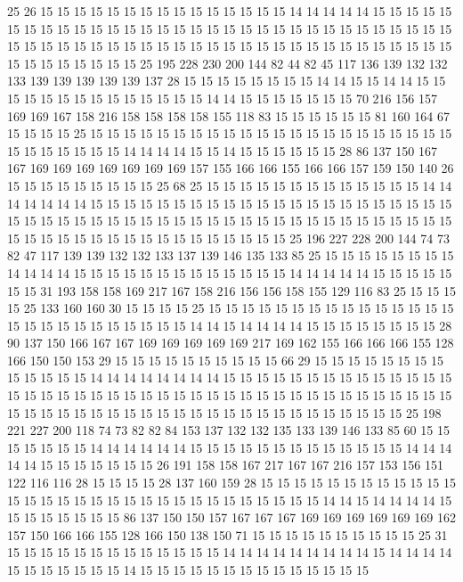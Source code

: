 25 26 15 15 15 15 15 15 15 15 15 15 15 15 15 15 15 14 14 14
14 14 15 15 15 15 15 15 15 15 15 15 15 15 15 15 15 15 15 15
15 15 15 15 15 15 15 15 15 15 15 15 15 15 15 15 15 15 15 15
15 15 15 15 15 15 15 15 15 15 15 15 15 15 15 15 15 15 15 15
15 15 15 15 15 15 15 15 15 25 195 228 230 200 144 82 44 82 45 117
136 139 132 132 133 139 139 139 139 139 137 28 15 15 15 15 15 15 15 15
14 14 15 15 14 14 15 15 15 15 15 15 15 15 15 15 15 15 15 15
14 14 15 15 15 15 15 15 15 70 216 156 157 169 169 167 158 216 158 158
158 158 155 118 83 15 15 15 15 15 15 81 160 164 67 15 15 15 15 25
15 15 15 15 15 15 15 15 15 15 15 15 15 15 15 15 15 15 15 15
15 15 15 15 15 15 15 15 15 14 14 14 14 15 15 14 15 15 15 15
15 15 28 86 137 150 167 167 169 169 169 169 169 169 169 157 155 166 166 155
166 166 157 159 150 140 26 15 15 15 15 15 15 15 15 15 25 68 25 15
15 15 15 15 15 15 15 15 15 15 15 15 14 14 14 14 14 14 14 15
15 15 15 15 15 15 15 15 15 15 15 15 15 15 15 15 15 15 15 15
15 15 15 15 15 15 15 15 15 15 15 15 15 15 15 15 15 15 15 15
15 15 15 15 15 15 15 15 15 15 15 15 15 15 15 15 15 15 15 15
15 15 15 15 15 25 196 227 228 200 144 74 73 82 47 117 139 139 132 132
133 137 139 146 135 133 85 25 15 15 15 15 15 15 15 15 14 14 14 14
15 15 15 15 15 15 15 15 15 15 15 15 15 14 14 14 14 14 15 15
15 15 15 15 15 31 193 158 158 169 217 167 158 216 156 156 158 155 129 116
83 25 15 15 15 15 25 133 160 160 30 15 15 15 15 25 15 15 15 15
15 15 15 15 15 15 15 15 15 15 15 15 15 15 15 15 15 15 15 15
15 15 14 14 15 14 14 14 14 15 15 15 15 15 15 15 15 28 90 137
150 166 167 167 169 169 169 169 169 217 169 162 155 166 166 166 155 128 166 150
150 153 29 15 15 15 15 15 15 15 15 15 15 66 29 15 15 15 15 15
15 15 15 15 15 15 15 15 14 14 14 14 14 14 14 14 15 15 15 15
15 15 15 15 15 15 15 15 15 15 15 15 15 15 15 15 15 15 15 15
15 15 15 15 15 15 15 15 15 15 15 15 15 15 15 15 15 15 15 15
15 15 15 15 15 15 15 15 15 15 15 15 15 15 15 15 15 15 15 15
15 25 198 221 227 200 118 74 73 82 82 84 153 137 132 132 135 133 139 146
133 85 60 15 15 15 15 15 15 15 14 14 14 14 14 14 15 15 15 15
15 15 15 15 15 15 15 15 15 14 14 14 14 14 15 15 15 15 15 15
15 26 191 158 158 167 217 167 167 216 157 153 156 151 122 116 116 28 15 15
15 15 28 137 160 159 28 15 15 15 15 15 15 15 15 15 15 15 15 15
15 15 15 15 15 15 15 15 15 15 15 15 15 15 15 15 15 15 14 14
15 14 14 14 14 15 15 15 15 15 15 15 15 86 137 150 150 157 167 167
167 169 169 169 169 169 169 162 157 150 166 166 155 128 166 150 138 150 71 15
15 15 15 15 15 15 15 15 15 25 31 15 15 15 15 15 15 15 15 15
15 15 15 15 14 14 14 14 14 14 14 14 14 15 14 14 14 14 15 15
15 15 15 15 15 14 15 15 15 15 15 15 15 15 15 15 15 15 15 15

